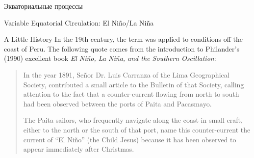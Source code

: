 \begin{chapter}{Экваториальные процессы}
\begin{section}{Variable Equatorial Circulation: El Ni\~{n}o/La Ni\~{n}a}
\begin{paragraph}{A Little History}
In the 19th century, the term was applied to conditions off the coast
of Peru. The following quote comes from the introduction to
Philander's (1990) excellent book \textit{El Ni\~{n}o, La Ni\~{n}a,
and the Southern Oscillation}:
%
\begin{quotation}
In the year 1891, Se\~{n}or Dr. Luis Carranza of the Lima Geographical
Society, contributed a small article to the Bulletin of that Society,
calling attention to the fact that a counter-current flowing from
north to south had been observed between the ports of Paita and
Pacasmayo.
%

The Paita sailors, who frequently navigate along the coast in small
craft, either to the north or the south of that port, name this
counter-current the current of ``El Ni\~{n}o'' (the Child Jesus)
because it has been observed to appear immediately after Christmas.
%


\end{quotation}
\end{paragraph}
\end{section}
\end{chapter}
